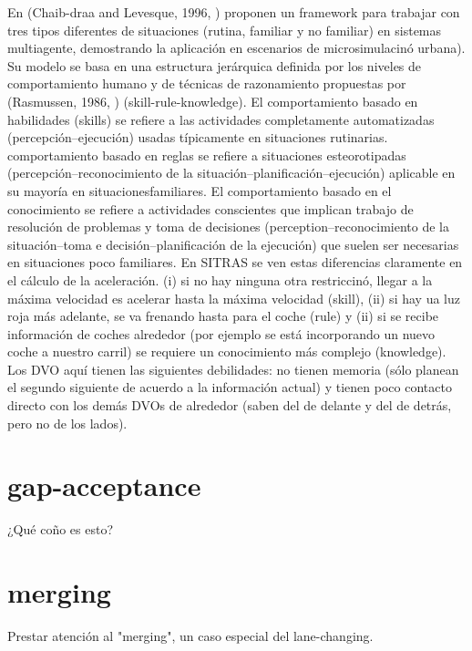 En (Chaib-draa and Levesque, 1996, ) proponen un framework para trabajar con tres tipos diferentes de situaciones (rutina, familiar y no familiar) en sistemas multiagente, demostrando la aplicación en escenarios de microsimulacinó urbana). Su modelo se basa en una estructura jerárquica definida por los niveles de comportamiento humano y de técnicas de razonamiento propuestas por (Rasmussen, 1986, ) (skill-rule-knowledge). El comportamiento basado en habilidades (skills) se refiere a las actividades completamente automatizadas (percepción--ejecución) usadas típicamente en situaciones rutinarias. comportamiento basado en reglas se refiere a situaciones esteorotipadas (percepción--reconocimiento de la situación--planificación--ejecución) aplicable en su mayoría en situacionesfamiliares. El comportamiento basado en el conocimiento se refiere a actividades conscientes que implican trabajo de resolución de problemas y toma de decisiones (perception--reconocimiento de la situación--toma e decisión--planificación de la ejecución) que suelen ser necesarias en situaciones poco familiares. En SITRAS se ven estas diferencias claramente en el cálculo de la aceleración. (i) si no hay ninguna otra restriccinó, llegar a la máxima velocidad es acelerar hasta la máxima velocidad (skill), (ii) si hay ua luz roja más adelante, se va frenando hasta para el coche (rule) y (ii) si se recibe información de coches alrededor (por ejemplo se está incorporando un nuevo coche a nuestro carril) se requiere un conocimiento más complejo (knowledge). Los DVO aquí tienen las siguientes debilidades: no tienen memoria (sólo planean el segundo siguiente de acuerdo a la información actual) y tienen poco contacto directo con los demás DVOs de alrededor (saben del de delante y del de detrás, pero no de los lados).

\section{gap-acceptance}

¿Qué coño es esto?

\section{merging}

Prestar atención al "merging", un caso especial del lane-changing.